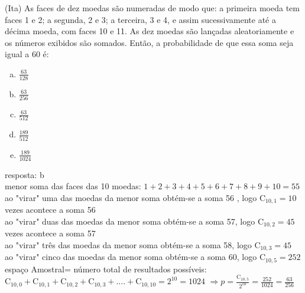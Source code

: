 \begin{ex}
   (Ita) As faces de dez moedas são numeradas de modo que: a primeira moeda tem faces 1 e 2; a segunda, 2 e 3; a terceira, 3 e 4, e assim sucessivamente até a décima moeda, com faces 10 e 11. As dez moedas são lançadas aleatoriamente e os números exibidos são somados. Então, a probabilidade de que essa soma seja igual a 60 é:
     \begin{enumerate} [(a)]
         \item $\frac{63}{128}$
         \item $\frac{63}{256}$
         \item $\frac{63}{512}$
         \item $\frac{189}{512}$
         \item $\frac{189}{1024}$
     \end{enumerate}
       \begin{sol}
       resposta: b \\
       menor soma das faces das 10 moedas: $1+2+3+4+5+6+7+8+9+10=55$\\
       ao "virar" uma das moedas da menor soma obtém-se a soma 56 , logo $\mathrm{C}_{{10},1}= 10$ vezes acontece a soma 56 \\
       ao "virar" duas das moedas da menor soma obtém-se a soma 57, 
       logo $\mathrm{C}_{{10},2}= 45$ vezes acontece a soma 57 \\
       ao "virar" três das moedas da menor soma obtém-se a soma 58,  logo $\mathrm{C}_{{10},3}= 45$ \\
       ao "virar" cinco das moedas da menor soma obtém-se a soma 60,  logo $\mathrm{C}_{{10},5}= 252$ \\
       espaço Amostral= número total de resultados possíveis: $\mathrm{C}_{{10},0}+\mathrm{C}_{{10},1}+\mathrm{C}_{{10},2}+\mathrm{C}_{{10},3}+....+\mathrm{C}_{{10},10}= 2^{10}=1024$
       $\Longrightarrow p=\frac{\mathrm{C}_{{10},5}}{2^{10}}=\frac{252}{1024}=\frac{63}{256}$
       \end{sol}
  \end{ex}